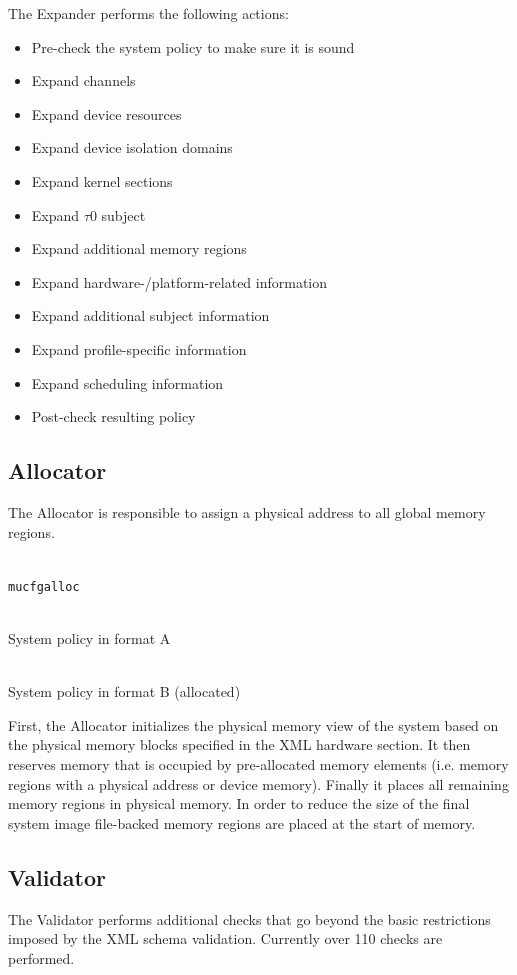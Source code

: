 \documentclass[a4paper,twoside,titlepage]{article}
\begin{document}
The Expander performs the following actions:
\begin{itemize}
	\item Pre-check the system policy to make sure it is sound
	\item Expand channels
	\item Expand device resources
	\item Expand device isolation domains
	\item Expand kernel sections
	\item Expand $\tau$0 subject
	\item Expand additional memory regions
	\item Expand hardware-/platform-related information
	\item Expand additional subject information
	\item Expand profile-specific information
	\item Expand scheduling information
	\item Post-check resulting policy
\end{itemize}

\subsection{Allocator}
\label{sec:tools-allocator}
The Allocator is responsible to assign a physical address to all global memory
regions.

\begin{description} \itemsep1pt \parskip0pt
	\item[Name] \hfill \\
		\texttt{mucfgalloc}
	\item[Input] \hfill \\
		System policy in format A
	\item[Output] \hfill \\
		System policy in format B (allocated)
\end{description}

First, the Allocator initializes the physical memory view of the system based
on the physical memory blocks specified in the XML hardware section. It then
reserves memory that is occupied by pre-allocated memory elements (i.e. memory
regions with a physical address or device memory).  Finally it places all
remaining memory regions in physical memory.  In order to reduce the size of
the final system image file-backed memory regions are placed at the start of
memory.

\subsection{Validator}
\label{sec:tools-validator}
The Validator performs additional checks that go beyond the basic restrictions
imposed by the XML schema validation. Currently over 110 checks are performed.
\end{document}
